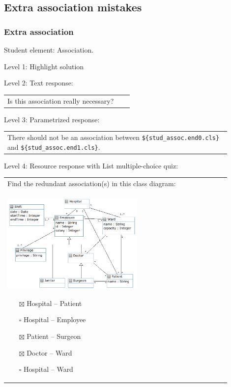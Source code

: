 \subsection{Extra association mistakes}

\subsubsection{Extra association}

Student element: Association.  \medskip

\noindent Level 1: Highlight solution  \medskip

\noindent Level 2: Text response: \medskip

\begin{tabular}{|p{0.9\linewidth}}
Is this association really necessary?
\end{tabular} \medskip

\noindent Level 3: Parametrized response: \medskip

\begin{tabular}{|p{0.9\linewidth}}
There should not be an association between \verb|${stud_assoc.end0.cls}| and \verb|${stud_assoc.end1.cls}|.
\end{tabular} \medskip

\noindent Level 4: Resource response with List multiple-choice quiz: \medskip

\begin{tabular}{|p{0.9\linewidth}}

Find the redundant association(s) in this class diagram:

\\
\includegraphics[width=0.6\textwidth]{images/hospital_cdm_extra_assocs.png}

\begin{itemize}
    \item[$\boxtimes$] Hospital -- Patient
    \item[$\square$] Hospital -- Employee
    \item[$\boxtimes$] Patient -- Surgeon
    \item[$\boxtimes$] Doctor -- Ward
    \item[$\square$] Hospital -- Ward
\end{itemize}

\end{tabular} \medskip

